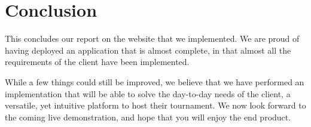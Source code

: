 \section{Conclusion}
\label{sec:Conclusion}


This concludes our report on the website that we implemented. 
We are proud of having deployed an application that is almost complete, 
in that almost all the requirements of the client have been implemented. \newline

While a few things could still be improved, we believe that we have performed
an implementation that will be able to solve the day-to-day needs of the
client, a versatile, yet intuitive platform to host their
tournament. We now look forward to the coming live demonstration, and hope that
you will enjoy the end product.